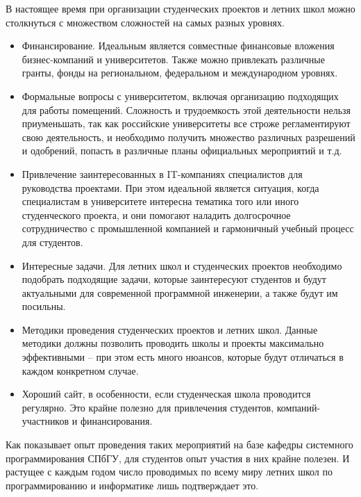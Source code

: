 \documentclass[a5paper]{article}
\begin{document}
В настоящее время при организации студенческих проектов и летних школ можно столкнуться с множеством сложностей на самых разных уровнях. 

\begin{itemize}
 \item Финансирование. Идеальным является совместные финансовые вложения бизнес-компаний и университетов. Также можно привлекать различные гранты, фонды на региональном, федеральном и международном уровнях. 
 \item Формальные вопросы с университетом, включая организацию подходящих для работы помещений. Сложность и трудоемкость этой деятельности нельзя приуменьшать, так как российские университеты все строже регламентируют свою деятельность, и необходимо получить множество различных разрешений и одобрений, попасть в различные планы официальных мероприятий и т.д. 
 \item Привлечение заинтересованных в IT-компаниях специалистов для руководства проектами. При  этом идеальной является ситуация, когда специалистам в университете интересна тематика того или иного студенческого проекта, и они помогают наладить долгосрочное сотрудничество с промышленной компанией и гармоничный учебный процесс для студентов.  
 \item Интересные задачи. Для летних школ и студенческих проектов необходимо подобрать подходящие задачи, которые заинтересуют студентов и будут актуальными для современной программной инженерии, а также будут им посильны. 
 \item Методики проведения студенческих проектов и летних школ. Данные методики должны  позволить проводить школы и проекты максимально эффективными -- при этом есть много нюансов, которые будут отличаться в каждом конкретном случае.  
 \item Хороший сайт, в особенности, если студенческая школа проводится регулярно. Это крайне полезно для привлечения студентов, компаний-участников и финансирования. 
\end{itemize}
  
Как показывает опыт проведения таких мероприятий на базе кафедры системного программирования СПбГУ, для студентов опыт участия в них крайне полезен. И растущее с каждым годом число проводимых по всему миру летних школ по программированию и информатике лишь подтверждает это.
\end{document}
